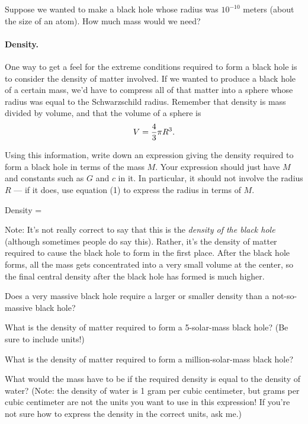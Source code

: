 \vskip 1in

Suppose we wanted to make a black hole whose radius was $10^{-10}$ meters
(about the size of an atom).  How much mass would we need?

\vskip 1in

\paragraph{Density.}
One way to get a feel for the extreme conditions required to form
a black hole is to consider the density of matter involved.
If we wanted to produce a black hole of a certain mass, we'd have
to compress all of that matter into a sphere whose radius was
equal to the Schwarzschild radius.  Remember that density is
mass divided by volume, and that the volume of a sphere is
$$
V={4\over 3}\pi R^3.
$$

Using this information, 
write down an expression giving the density required to form a black
hole in terms of the mass $M$.  Your expression should just have $M$
and constants such as $G$ and $c$ in it.  In
particular, it should not involve the radius $R$ --- 
if it does, use equation (1) to 
express the radius in terms of $M$.

\vskip 2in

Density = 

\vskip 0.5in

Note: It's not really correct to say that this is the {\it density
of the black hole} (although sometimes people do say this).  Rather,
it's the density of matter required to cause the black hole to form in
the first place.  After the black hole forms, all the mass gets concentrated
into a very small volume at the center, so the final central density after the
black hole has formed is much higher.

Does a very massive black hole require a larger or smaller density
than a not-so-massive black hole?

\vskip 1in

What is the density of matter required to form a 5-solar-mass black hole?
(Be sure to include units!)

\vskip 1in

What is the density of matter required to form a million-solar-mass
black hole?

\vskip 1in

What would the mass have to be if the required density is equal to the
density of water?  (Note: the density of water is 1 gram per cubic
centimeter, but grams per cubic centimeter are not the units you 
want to use in this expression!  If you're not sure how to express
the density in the correct units, ask me.)

